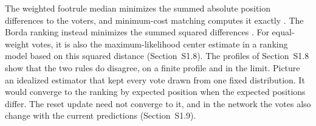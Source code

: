 The weighted footrule median minimizes the summed absolute position differences to the voters, and minimum-cost matching computes it exactly \citep{dwork2001rank}. The Borda ranking instead minimizes the summed squared differences \citep{zwicker2008average}. For equal-weight votes, it is also the maximum-likelihood center estimate in a ranking model based on this squared distance \citep{fligner1986distance} (Section~S1.8). The profiles of Section~S1.8 show that the two rules do disagree, on a finite profile and in the limit. Picture an idealized estimator that kept every vote drawn from one fixed distribution. It would converge to the ranking by expected position when the expected positions differ. The reset update need not converge to it, and in the network the votes also change with the current predictions (Section~S1.9).
